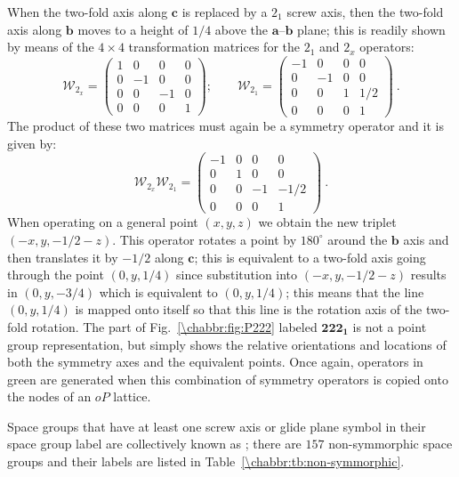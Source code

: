 When the two-fold axis along $\mathbf{c}$ is replaced by a $2_1$ screw axis, then the two-fold axis along $\mathbf{b}$ moves to a height of $1/4$ above the $\mathbf{a}$--$\mathbf{b}$ plane; this is readily shown by means of the $4\times 4$ transformation matrices for the $2_1$ and $2_x$ operators:
\[
	\mathcal{W}_{2_x} = \begin{pmatrix} 1&0&0&0\\ 0&-1&0&0\\ 0&0&-1&0\\ 0&0&0&1\end{pmatrix};\qquad
	\mathcal{W}_{2_1} = \begin{pmatrix} -1&0&0&0\\ 0&-1&0&0\\ 0&0&1&1/2\\ 0&0&0&1\end{pmatrix}\ . 
\]
The product of these two matrices must again be a symmetry operator and it is  given by:
\[
	\mathcal{W}_{2_x} \mathcal{W}_{2_1} = \begin{pmatrix} -1&0&0&0\\ 0&1&0&0\\ 0&0&-1&-1/2\\ 0&0&0&1\end{pmatrix}\ .
\]
When operating on a general point $(x,y,z)$ we obtain the new triplet $(-x,y,-1/2-z)$. This operator rotates a point by $180^{\circ}$ around the $\mathbf{b}$ axis and then translates it by $-1/2$ along $\mathbf{c}$; this is equivalent to a two-fold axis going through the point $(0,y,1/4)$ since substitution into $(-x,y,-1/2-z)$ results in $(0,y,-3/4)$ which is equivalent to $(0,y,1/4)$; this means that the line $(0,y,1/4)$ is mapped onto itself so that this line is the rotation axis of the two-fold rotation.  The part of Fig.~\ref{\chabbr:fig:P222} labeled $\mathbf{222_1}$ is not a point group representation, but simply shows the relative orientations and locations of both the symmetry axes and the equivalent points.  Once again, operators in green are generated when this combination of symmetry operators is copied onto the nodes of an $oP$ lattice.  

Space groups that have at least one screw axis or glide plane symbol in their space group label are collectively known as ; there are $157$ non-symmorphic space groups and their labels are listed in Table~\ref{\chabbr:tb:non-symmorphic}.

